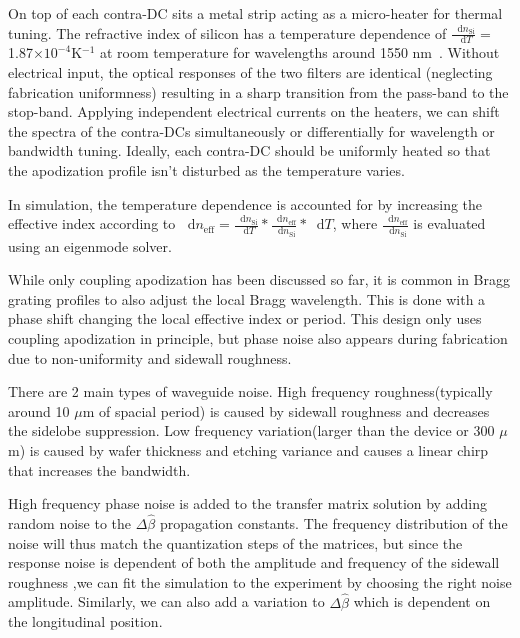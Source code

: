 \documentclass[9pt,twocolumn,twoside]{osajnl}
\newcommand*\diff{\mathop{}\!\mathrm{d}}
\begin{document}
On top of each contra-DC sits a metal strip acting as a micro-heater for thermal tuning.  
The refractive index of silicon has a temperature dependence of $\frac{\diff{n_\text{Si}}}{\diff{T}}=$ 1.87$\times10^{-4}$K$^{-1}$ at room temperature for wavelengths around 1550 nm~\cite{frey2006temperature}.
Without electrical input, the optical responses of the two filters are identical (neglecting fabrication uniformness) resulting in a sharp transition from the pass-band to the stop-band. 
Applying independent electrical currents on the heaters, we can shift the spectra of the contra-DCs simultaneously or differentially for wavelength or bandwidth tuning.
Ideally, each contra-DC should be uniformly heated so that the apodization profile isn't disturbed as the temperature varies.

In simulation, the temperature dependence is accounted for by increasing the effective index according to 
$\diff{n_\text{eff}}=\frac{\diff{n_\text{Si}}}{\diff{T}}*\frac{\diff{n_\text{eff}}}{\diff{n_\text{Si}}}*\diff{T}$, where $\frac{\diff{n_\text{eff}}}{\diff{n_\text{Si}}}$ is evaluated using an eigenmode solver.

While only coupling apodization has been discussed so far, it is common in Bragg grating profiles to also adjust the local Bragg wavelength. This is done with a phase shift changing the local effective index or period. This design only uses coupling apodization in principle, but phase noise also appears during fabrication due to non-uniformity and sidewall roughness.

There are 2 main types of waveguide noise. High frequency roughness(typically around 10 $\mu$m of spacial period\cite{simard2013characterization}) is caused by sidewall roughness and decreases the sidelobe suppression. Low frequency variation(larger than the device or 300 $\mu$m) is caused by wafer thickness and etching variance and causes a linear chirp that increases the bandwidth.

High frequency phase noise is added to the transfer matrix solution by adding random noise to the $\Delta\hat{\beta}$ propagation constants. The frequency distribution of the noise will thus match the quantization steps of the matrices, but since the response noise is dependent of both the amplitude and frequency of the sidewall roughness \cite{simard2011impact},we can fit the simulation to the experiment by choosing the right noise amplitude.
Similarly, we can also add a variation to $\Delta\hat{\beta}$ which is dependent on the longitudinal position.
\end{document}

